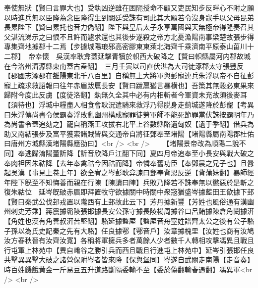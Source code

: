 奉使無狀【賢曰言罪大也】受執凶逆雖在困阨授命不顧又吏民知步反畔心不附之願以時進兵無以臣隆為念臣隆得生到闕廷受誅有司此其大願若令沒身寇手以父母昆弟長累陛下【賢曰累托也音力偽翻】陛下與皇后太子永享萬國與天無極帝得隆奏召其父湛流涕示之曰恨不且許而遽求還也其後步遂殺之帝方北憂漁陽南事梁楚故張步得專集齊地據郡十二焉【步據城陽琅邪高密膠東東萊北海齊千乘濟南平原泰山菑川十二郡】　帝幸懷　吳漢率耿弇蓋延擊青犢於軹西大破降之【賢曰軹縣屬河内郡故城在今洛州濟源縣東南蓋古盍翻】　三月壬寅以司直伏湛為大司徒涿郡太守張豐反【郡國志涿郡在雒陽東北千八百里】自稱無上大將軍與彭寵連兵朱浮以帝不自征彭寵上疏求救詔報曰往年赤眉跋扈長安【賢曰跋扈猶言暴横也】吾策其無穀必東果來歸附今度此反虜【度徒洛翻】埶無久全其中必有内相斬者今軍資未充故須後麥耳【須待也】浮城中糧盡人相食會耿況遣騎來救浮乃得脱身走薊城遂降於彭寵【考異曰朱浮傳尚書令侯霸奏浮敗亂幽州構成寵罪徒勞軍師不能死節罪當伏誅按霸明年乃為尚書令蓋追劾之】寵自稱燕王攻拔右北平上谷數縣賂遺匈奴【遺于季翻】借兵為助又南結張步及富平獲索諸賊皆與交通帝自將征鄧奉至堵陽【堵陽縣屬南陽郡杜佑曰唐州方城縣漢堵陽縣應劭曰】<br />
<br />
　　【堵陽景帝改為順陽二說不同】奉逃歸淯陽董訢降【訢音欣降戶江翻下同】夏四月帝追奉至小長安與戰大破之奉肉袒因朱祜降【去年奉禽祜今因祜而降】帝憐奉舊功臣【奉鄧晨之兄子也】且釁起吳漢【事見上卷上年】欲全宥之岑彭耿弇諫曰鄧奉背恩反逆【背蒲妹翻】暴師經年陛下旣至不知悔善而親在行陳【陳讀曰陣】兵敗乃降若不誅奉無以懲惡於是斬之復朱祜位　延岑旣破赤眉即拜置牧守欲據關中時關中衆宼猶盛岑據藍田王歆據下邽【賢曰秦武公伐邽戎置以隴西有上邽故此云下】芳丹據新豐【芳姓也風俗通有漢幽州刺史芳乘】蔣震據霸陵張邯據長安公孫守據長陵楊周據谷口呂鮪據陳倉角閎據汧【角姓也漢有角善叔汧苦堅翻】駱延據盩厔【盩厔音舟窒姓譜齊太公之後有公子駱子孫以為氏史記秦之先有大駱】任良據鄠【鄠音戶】汝章據槐里【汝姓也商有汝鳩汝方春秋晉有汝齊汝寛】各稱將軍擁兵多者萬餘人少者數千人轉相攻擊馮異且戰且行屯軍上林苑中【異自崤谷之勝引兵而西且戰且行進屯上林苑中】延岑引張邯任良共擊異異擊大破之諸營保附岑者皆來降【保與堡同】岑遂自武關走南陽【走音奏】時百姓饑餓黄金一斤易豆五升道路斷隔委輸不至【委於偽翻輸春遇翻】馮異軍<br />
<br />
